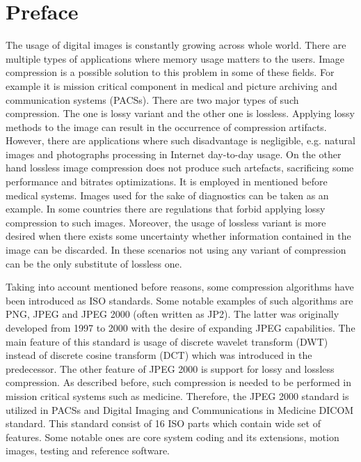 \section{Preface}

The usage of digital images is constantly growing across whole world. There are multiple types
of applications where memory usage matters to the users. Image compression is a possible solution
to this problem in some of these fields. For example it is mission critical component in medical
and picture archiving and communication systems (PACSs). \cite{entropy} There are two major types
of such compression. The one is lossy variant and the other one is lossless. Applying lossy methods
to the image can result in the occurrence of compression artifacts. However, there are applications
where such disadvantage is negligible, e.g. natural images and photographs processing in Internet day-to-day usage.
\cite{img_compress} On the other hand lossless image compression does not produce such artefacts,
sacrificing some performance and bitrates optimizations. It is employed in mentioned before medical systems.
Images used for the sake of diagnostics can be taken as an example. In some countries there are
regulations that forbid applying lossy compression to such images. \cite{entropy} Moreover, the
usage of lossless variant is more desired when there exists some uncertainty whether information
contained in the image can be discarded. In these scenarios not using any variant of compression
can be the only substitute of lossless one. \cite{entropy}

Taking into account mentioned before reasons, some compression algorithms have been introduced as ISO
standards. \cite{entropy} Some notable examples of such algorithms are PNG, JPEG and JPEG 2000 (often written as JP2).
The latter was originally developed from 1997 to 2000 with the desire of expanding JPEG capabilities.
The main feature of this standard is usage of discrete wavelet transform (DWT) instead of discrete
cosine transform (DCT) which was introduced in the predecessor. \cite{jpeg2000} The other feature
of JPEG 2000 is support for lossy and lossless compression. As described before, such compression
is needed to be performed in mission critical systems such as medicine. Therefore, the JPEG 2000 standard
is utilized in PACSs and Digital Imaging and Communications in Medicine DICOM standard. \cite{entropy}
This standard consist of 16 ISO parts which contain wide set of features. Some notable ones are core system
coding and its extensions, motion images, testing and reference software. \cite{jpeg2000}

